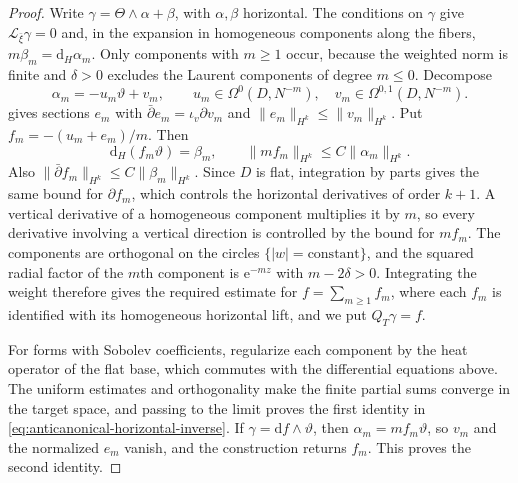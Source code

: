 \begin{proof}
Write $\gamma=\Theta\wedge\alpha+\beta$, with $\alpha,\beta$ horizontal. The conditions on $\gamma$ give $\mathcal L_{\bar\xi}\gamma=0$ and, in the expansion in homogeneous components along the fibers, $m\beta_m=\mathrm d_H\alpha_m$. Only components with $m\geq1$ occur, because the weighted norm is finite and $\delta>0$ excludes the Laurent components of degree $m\leq0$. Decompose
\[
 \alpha_m=-u_m\vartheta+v_m,
 \qquad u_m\in\Omega^0(D,N^{-m}),\quad
 v_m\in\Omega^{0,1}(D,N^{-m}).
\]
 gives sections $e_m$ with $\bar\partial e_m=\iota_v\partial v_m$ and $\|e_m\|_{H^k}\leq\|v_m\|_{H^k}$. Put $f_m=-(u_m+e_m)/m$. Then
\[
 \mathrm d_H(f_m\vartheta)=\beta_m,\qquad
 \|mf_m\|_{H^k}\leq C\|\alpha_m\|_{H^k}.
\]
Also $\|\bar\partial f_m\|_{H^k}\leq C\|\beta_m\|_{H^k}$. Since $D$ is flat, integration by parts gives the same bound for $\partial f_m$, which controls the horizontal derivatives of order $k+1$. A vertical derivative of a homogeneous component multiplies it by $m$, so every derivative involving a vertical direction is controlled by the bound for $mf_m$. The components are orthogonal on the circles $\{|w|=\text{constant}\}$, and the squared radial factor of the $m$th component is $\mathrm e^{-mz}$ with $m-2\delta>0$. Integrating the weight therefore gives the required estimate for $f=\sum_{m\geq1}f_m$, where each $f_m$ is identified with its homogeneous horizontal lift, and we put $Q_T\gamma=f$.

For forms with Sobolev coefficients, regularize each component by the heat operator of the flat base, which commutes with the differential equations above. The uniform estimates and orthogonality make the finite partial sums converge in the target space, and passing to the limit proves the first identity in \eqref{eq:anticanonical-horizontal-inverse}. If $\gamma=\mathrm df\wedge\vartheta$, then $\alpha_m=mf_m\vartheta$, so $v_m$ and the normalized $e_m$ vanish, and the construction returns $f_m$. This proves the second identity.


\end{proof}
